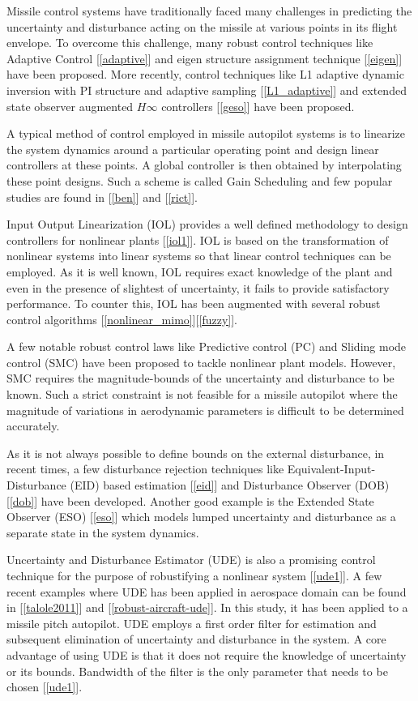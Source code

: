 \documentclass[conference]{IEEEtran}
\begin{document}
	Missile control systems have traditionally faced many challenges in predicting the uncertainty and disturbance acting on the missile at various points in its flight envelope. To overcome this challenge, many robust control techniques like Adaptive Control [\ref{adaptive}] and eigen structure assignment technique [\ref{eigen}] have been proposed. More recently, control techniques like L1 adaptive dynamic inversion with PI structure and adaptive sampling [\ref{L1_adaptive}] and extended state observer augmented $H\infty$ controllers [\ref{geso}] have been proposed. 
	
	A typical method of control employed in missile autopilot systems is to linearize the system dynamics around a particular operating point and design linear controllers at these points. A global controller is then obtained by interpolating these point designs. Such a scheme is called Gain Scheduling and few popular studies are found in [\ref{ben}] and [\ref{rict}]. 
	
	Input Output Linearization (IOL) provides a well defined methodology to design controllers for nonlinear plants [\ref{iol1}]. IOL is based on the transformation of nonlinear systems into linear systems so that linear control techniques can be employed. As it is well known, IOL requires exact knowledge of the plant and even in the presence of slightest of uncertainty, it fails to provide satisfactory performance. To counter this, IOL has been augmented with several robust control algorithms [\ref{nonlinear_mimo}][\ref{fuzzy}].
	
	A few notable robust control laws like Predictive control (PC) and Sliding mode control (SMC) have been proposed to tackle nonlinear plant models. However, SMC requires the magnitude-bounds of the uncertainty and disturbance to be known. Such a strict constraint is not feasible  for a missile autopilot where the magnitude of variations in aerodynamic parameters is difficult to be determined accurately.  
	
	As it is not always possible to define bounds on the external disturbance, in recent times, a few disturbance rejection techniques like Equivalent-Input-Disturbance (EID) based estimation [\ref{eid}] and Disturbance Observer (DOB) [\ref{dob}] have been developed. Another good example is the Extended State Observer (ESO) [\ref{eso}] which models lumped uncertainty and disturbance as a separate state in the system dynamics. 
	
	Uncertainty and Disturbance Estimator (UDE) is also a promising control technique for the purpose of robustifying a nonlinear system [\ref{ude1}]. A few recent examples where UDE has been applied in aerospace domain can be found in [\ref{talole2011}] and [\ref{robust-aircraft-ude}]. In this study, it has been applied to a missile pitch autopilot. UDE employs a first order filter for estimation and subsequent elimination of uncertainty and disturbance in the system. A core advantage of using UDE is that it does not require the knowledge of uncertainty or its bounds. Bandwidth of the filter is the only parameter that needs to be chosen [\ref{ude1}].
	
\end{document}
